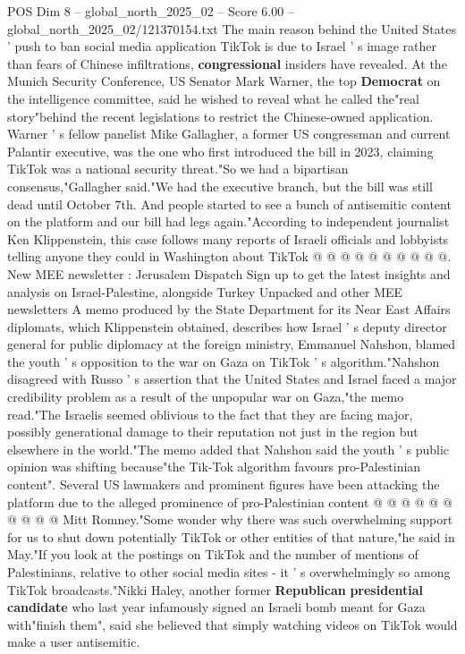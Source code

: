 \begin{textsample}{POS Dim 8 – global\_north\_2025\_02 – Score 6.00 – global\_north\_2025\_02/121370154.txt}  \label{ex:f8_pos_317}
The main reason behind the United States ' push to ban social media application TikTok is due to Israel ' s image rather than fears of Chinese infiltrations, \textbf{congressional} insiders have revealed.
At the Munich Security Conference, US Senator Mark Warner, the top \textbf{Democrat} on the intelligence committee, said he wished to reveal what he called the"real story"behind the recent legislations to restrict the Chinese-owned application.
Warner ' s fellow panelist Mike Gallagher, a former US congressman and current Palantir executive, was the one who first introduced the bill in 2023, claiming TikTok was a national security threat."So we had a bipartisan consensus,"Gallagher said."We had the executive branch, but the bill was still dead until October 7th.
And people started to see a bunch of antisemitic content on the platform and our bill had legs again."According to independent journalist Ken Klippenstein, this case follows many reports of Israeli officials and lobbyists telling anyone they could in Washington about TikTok @ @ @ @ @ @ @ @ @ @.
New MEE newsletter : Jerusalem Dispatch Sign up to get the latest insights and analysis on Israel-Palestine, alongside Turkey Unpacked and other MEE newsletters A memo produced by the State Department for its Near East Affairs diplomats, which Klippenstein obtained, describes how Israel ' s deputy director general for public diplomacy at the foreign ministry, Emmanuel Nahshon, blamed the youth ' s opposition to the war on Gaza on TikTok ' s algorithm."Nahshon disagreed with Russo ' s assertion that the United States and Israel faced a major credibility problem as a result of the unpopular war on Gaza,"the memo read."The Israelis seemed oblivious to the fact that they are facing major, possibly generational damage to their reputation not just in the region but elsewhere in the world."The memo added that Nahshon said the youth ' s public opinion was shifting because"the Tik-Tok algorithm favours pro-Palestinian content".
Several US lawmakers and prominent figures have been attacking the platform due to the alleged prominence of pro-Palestinian content @ @ @ @ @ @ @ @ @ @ Mitt Romney."Some wonder why there was such overwhelming support for us to shut down potentially TikTok or other entities of that nature,"he said in May."If you look at the postings on TikTok and the number of mentions of Palestinians, relative to other social media sites - it ' s overwhelmingly so among TikTok broadcasts."Nikki Haley, another former \textbf{Republican} \textbf{presidential} \textbf{candidate} who last year infamously signed an Israeli bomb meant for Gaza with"finish them", said she believed that simply watching videos on TikTok would make a user antisemitic.

\end{textsample}
